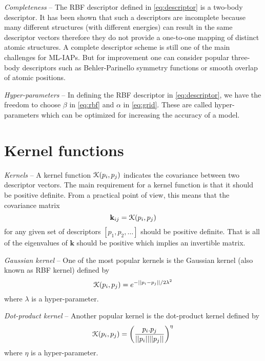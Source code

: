 \documentclass[12pt]{article}
\DeclarePairedDelimiter\paren{(}{)}
\DeclarePairedDelimiter\norm{||}{||}
\newcommand{\des}{p}
\newcommand{\kernel}{\EuScript{K}}
\begin{document}
\emph{Completeness} --
The RBF descriptor defined in \autoref{eq:descriptor}
is a two-body descriptor.
It has been shown that such a descriptors are incomplete
because many different structures (with different energies)
can result in the same descriptor vectors therefore they do
not provide a one-to-one mapping of distinct atomic structures.
A complete descriptor scheme is still one of the main
challenges for ML-IAPs.
But for improvement one can consider popular three-body
descriptors such as Behler-Parinello symmetry functions
or smooth overlap of atomic positions.

\emph{Hyper-parameters} --
In defining the RBF descriptor in \autoref{eq:descriptor},
we have the freedom to choose $\beta$ in \autoref{eq:rbf}
and $\alpha$ in \autoref{eq:grid}.
These are called hyper-parameters which can be optimized
for increasing the accuracy of a model.


\section{Kernel functions}\label{sec:kernels}

\emph{Kernels} --
A kernel function $\kernel(\des_i, \des_j)$ indicates the
covariance between two descriptor vectors.
The main requirement for a kernel function is that
it should be positive definite.
From a practical point of view, this means that
the covariance matrix
\begin{equation}
    \mathbf{k}_{ij} =
        \kernel(\des_i,\des_j)
\end{equation}
for any given set of descriptors $[\des_1, \des_2, \ldots]$
should be positive definite.
That is all of the eigenvalues of $\mathbf{k}$ should
be positive which implies an invertible matrix.

\emph{Gaussian kernel} --
One of the most popular kernels is the Gaussian kernel
(also known as RBF kernel) defined by
\begin{equation}\label{eq:gaussian}
    \kernel(\des_i, \des_j) =
        e^{-\norm{\des_i-\des_j}/2\lambda^2}
\end{equation}
where $\lambda$ is a hyper-parameter.

\emph{Dot-product kernel} --
Another popular kernel is the dot-product kernel defined by
\begin{equation}\label{eq:dotprod}
    \kernel(\des_i, \des_j) =
        \paren*{\frac{\des_i.\des_j}{\norm{\des_i}\norm{\des_j}}}^\eta
\end{equation}
where $\eta$ is a hyper-parameter.
\end{document}
